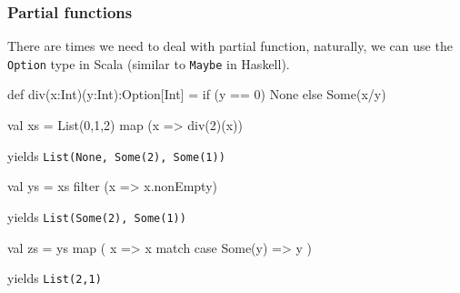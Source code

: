 \documentclass{beamer}
\newcommand{\beb}{\begin{exampleblock}}
\newcommand{\eeb}{\end{exampleblock}}
\begin{document}
\begin{frame}[fragile]
\frametitle{Partial functions}
There are times we need to deal with partial function, naturally, we
can use the {\tt Option} type in Scala (similar to {\tt Maybe} in
Haskell).
\beb{}
\begin{code}
def div(x:Int)(y:Int):Option[Int] =  {
    if (y == 0) None else Some(x/y)
}

val xs = List(0,1,2) map (x => div(2)(x))
\end{code}
\eeb
yields {\tt  List(None, Some(2), Some(1))}
\beb{}
\begin{code}
val ys = xs filter (x => x.nonEmpty) 
\end{code}
\eeb
yields {\tt List(Some(2), Some(1))}
\beb{}
\begin{code}
val zs = ys map ( x => x match { case Some(y) => y } ) 
\end{code}
\eeb
yields {\tt List(2,1)}
\end{frame}
\end{document}
